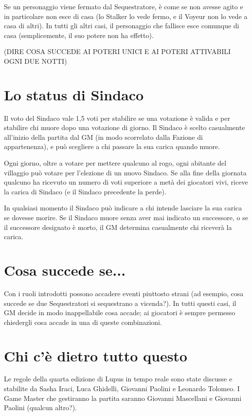 \documentclass[a4paper,10pt]{article}
\begin{document}
Se un personaggio viene fermato dal Sequestratore, è come se non avesse agito e in particolare non esce di casa (lo Stalker lo vede fermo, e il Voyeur non lo vede a casa di altri).
In tutti gli altri casi, il personaggio che fallisce esce comunque di casa (semplicemente, il suo potere non ha effetto).

(DIRE COSA SUCCEDE AI POTERI UNICI E AI POTERI ATTIVABILI OGNI DUE NOTTI)


\section{Lo status di Sindaco}

Il voto del Sindaco vale 1,5 voti per stabilire se una votazione è valida e per stabilire chi muore dopo una votazione di giorno.
Il Sindaco è scelto casualmente all'inizio della partita dal GM (in modo scorrelato dalla Fazione di appartenenza), e può scegliere a chi passare la sua carica quando muore.

Ogni giorno, oltre a votare per mettere qualcuno al rogo, ogni abitante del villaggio può votare per l'elezione di un nuovo Sindaco. Se alla fine della giornata qualcuno ha ricevuto un numero di voti superiore a metà dei giocatori vivi, riceve la carica di Sindaco (e il Sindaco precedente la perde).

In qualsiasi momento il Sindaco può indicare a chi intende lasciare la sua carica se dovesse morire. Se il Sindaco muore senza aver mai indicato un successore, o se il successore designato è morto, il GM determina casualmente chi riceverà la carica.


\section{Cosa succede se...}

Con i ruoli introdotti possono accadere eventi piuttosto strani (ad esempio, cosa succede se due Sequestratori si sequestrano a vicenda?). In tutti questi casi, il GM decide in modo inappellabile cosa accade; ai giocatori è sempre permesso chiedergli cosa accade in una di queste combinazioni.


\section{Chi c'è dietro tutto questo}

Le regole della quarta edizione di Lupus in tempo reale sono state discusse e stabilite da Sasha Iraci, Luca Ghidelli, Giovanni Paolini e Leonardo Tolomeo.
I Game Master che gestiranno la partita saranno Giovanni Mascellani e Giovanni Paolini (qualcun altro?).
\end{document}
